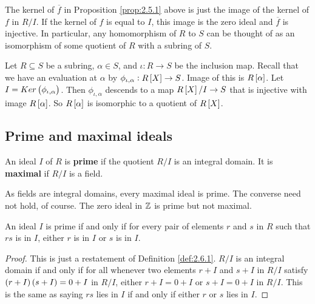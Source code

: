 \begin{note*}
The kernel of $ \overline{f} $ in Proposition \ref{prop:2.5.1} above is just the image of the kernel of $ f $ in $ R / I $. If the kernel of $ f $ is equal to $ I $, this image is the zero ideal and $ \overline{f} $ is injective. In particular, any homomorphism of $ R $ to $ S $ can be thought of as an isomorphism of some quotient of $ R $ with a subring of $ S $.
\end{note*}

\begin{example*}
Let $ R \subseteq S $ be a subring, $ \alpha \in S $, and $ \iota : R \to S $ be the inclusion map. Recall that we have an evaluation at $ \alpha $ by $ \phi_{\iota, \alpha} : R\sbr{X} \to S $. Image of this is $ R\sbr{\alpha} $. Let $ I = Ker\br{\phi_{\iota, \alpha}} $. Then $ \phi_{\iota, \alpha} $ descends to a map $ R\sbr{X} / I \to S $ that is injective with image $ R\sbr{\alpha} $. So $ R\sbr{\alpha} $ is isomorphic to a quotient of $ R\sbr{X} $.
\end{example*}


\subsection{Prime and maximal ideals}

\begin{definition}
\label{def:2.6.1}
An ideal $ I $ of $ R $ is \textbf{prime} if the quotient $ R / I $ is an integral domain. It is \textbf{maximal} if $ R / I $ is a field.
\end{definition}

\begin{note*}
As fields are integral domains, every maximal ideal is prime. The converse need not hold, of course. The zero ideal in $ \mathbb{Z} $ is prime but not maximal.
\end{note*}

\begin{lemma}
An ideal $ I $ is prime if and only if for every pair of elements $ r $ and $ s $ in $ R $ such that $ rs $ is in $ I $, either $ r $ is in $ I $ or $ s $ is in $ I $.
\end{lemma}

\begin{proof}
This is just a restatement of Definition \ref{def:2.6.1}. $ R / I $ is an integral domain if and only if for all whenever two elements $ r + I $ and $ s + I $ in $ R / I $ satisfy $ \br{r + I}\br{s + I} = 0 + I $ in $ R / I $, either $ r + I = 0 + I $ or $ s + I = 0 + I $ in $ R / I $. This is the same as saying $ rs $ lies in $ I $ if and only if either $ r $ or $ s $ lies in $ I $.
\end{proof}

